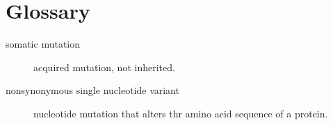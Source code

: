 \chapter*{Glossary}

\begin{description}
\item [somatic mutation] acquired mutation, not inherited.
\item [nonsynonymous single nucleotide variant] nucleotide mutation that alters thr amino acid sequence of a protein.
\end{description}
